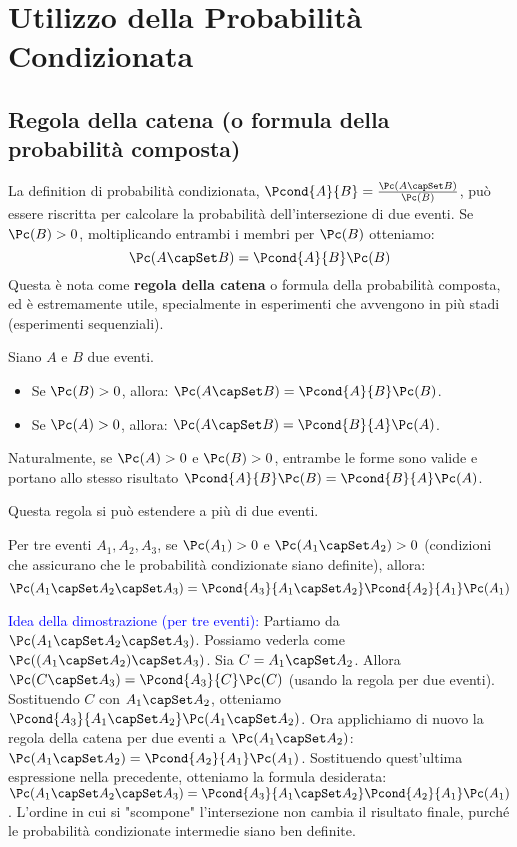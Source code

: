 \section{Utilizzo della Probabilità Condizionata}

\subsection{Regola della catena (o formula della probabilità composta)}
La definition di probabilità condizionata, $\Pcond{A}{B} = \frac{\Pc(A \capSet B)}{\Pc(B)}$, può essere riscritta per calcolare la probabilità dell'intersezione di due eventi. Se $\Pc(B)>0$, moltiplicando entrambi i membri per $\Pc(B)$ otteniamo:
\[ \Pc(A \capSet B) = \Pcond{A}{B} \Pc(B) \]
Questa è nota come \textbf{regola della catena} o formula della probabilità composta, ed è estremamente utile, specialmente in esperimenti che avvengono in più stadi (esperimenti sequenziali).

\begin{theorem}
Siano $A$ e $B$ due eventi.
\begin{itemize}
    \item Se $\Pc(B) > 0$, allora: $\Pc(A \capSet B) = \Pcond{A}{B} \Pc(B)$.
    \item Se $\Pc(A) > 0$, allora: $\Pc(A \capSet B) = \Pcond{B}{A} \Pc(A)$.
\end{itemize}
Naturalmente, se $\Pc(A)>0$ e $\Pc(B)>0$, entrambe le forme sono valide e portano allo stesso risultato $\Pcond{A}{B} \Pc(B) = \Pcond{B}{A} \Pc(A)$.
\end{theorem}

Questa regola si può estendere a più di due eventi.
\begin{theorem}
Per tre eventi $A_1, A_2, A_3$, se $\Pc(A_1) > 0$ e $\Pc(A_1 \capSet A_2) > 0$ (condizioni che assicurano che le probabilità condizionate siano definite), allora:
\[ \Pc(A_1 \capSet A_2 \capSet A_3) = \Pcond{A_3}{A_1 \capSet A_2} \Pcond{A_2}{A_1} \Pc(A_1) \]
\end{theorem}
\textcolor{blue}{Idea della dimostrazione (per tre eventi):}
Partiamo da $\Pc(A_1 \capSet A_2 \capSet A_3)$. Possiamo vederla come $\Pc((A_1 \capSet A_2) \capSet A_3)$.
Sia $C = A_1 \capSet A_2$. Allora $\Pc(C \capSet A_3) = \Pcond{A_3}{C} \Pc(C)$ (usando la regola per due eventi).
Sostituendo $C$ con $A_1 \capSet A_2$, otteniamo $\Pcond{A_3}{A_1 \capSet A_2} \Pc(A_1 \capSet A_2)$.
Ora applichiamo di nuovo la regola della catena per due eventi a $\Pc(A_1 \capSet A_2)$:
$\Pc(A_1 \capSet A_2) = \Pcond{A_2}{A_1} \Pc(A_1)$.
Sostituendo quest'ultima espressione nella precedente, otteniamo la formula desiderata:
$\Pc(A_1 \capSet A_2 \capSet A_3) = \Pcond{A_3}{A_1 \capSet A_2} \Pcond{A_2}{A_1} \Pc(A_1)$.
L'ordine in cui si "scompone" l'intersezione non cambia il risultato finale, purché le probabilità condizionate intermedie siano ben definite.

